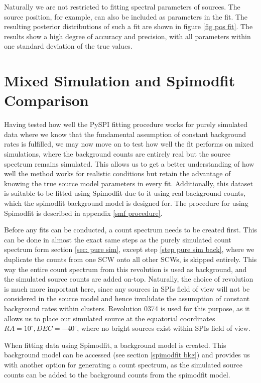 \documentclass{report}
\begin{document}
Naturally we are not restricted to fitting spectral parameters of sources. The source position, for example, can also be included as parameters in the fit. The resulting posterior distributions of such a fit are shown in figure \ref{fig pos fit}. The results show a high degree of accuracy and precision, with all parameters within one standard deviation of the true values.


\section{Mixed Simulation and Spimodfit Comparison} \label{sec: smf comparison}




Having tested how well the PySPI fitting procedure works for purely simulated data where we know that the fundamental assumption of constant background rates is fulfilled, we may now move on to test how well the fit performs on mixed simulations, where the background counts are entirely real but the source spectrum remains simulated. This allows us to get a better understanding of how well the method works for realistic conditions but retain the advantage of knowing the true source model parameters in every fit. Additionally, this dataset is suitable to be fitted using Spimodfit due to it using real background counts, which the spimodfit background model is designed for. The procedure for using Spimodfit is described in appendix \ref{smf procedure}.

Before any fits can be conducted, a count spectrum needs to be created first. This can be done in almost the exact same steps as the purely simulated count spectrum form section \ref{sec: pure sim}, except step \ref{step pure sim back}, where we duplicate the counts from one SCW onto all other SCWs, is skipped entirely. This way the entire count spectrum from this revolution is used as background, and the simulated source counts are added on-top. Naturally, the choice of revolution is much more important here, since any sources in SPIs field of view will not be considered in the source model and hence invalidate the assumption of constant background rates within clusters. Revolution 0374 is used for this purpose, as it allows us to place our simulated source at the equatorial coordinates $RA=10^\circ, DEC=-40^\circ$, where no bright sources exist within SPIs field of view.

When fitting data using Spimodfit, a background model is created. This background model can be accessed (see section \ref{spimodfit bkg}) and provides us with another option for generating a count spectrum, as the simulated source counts can be added to the background counts from the spimodfit model.
\end{document}

